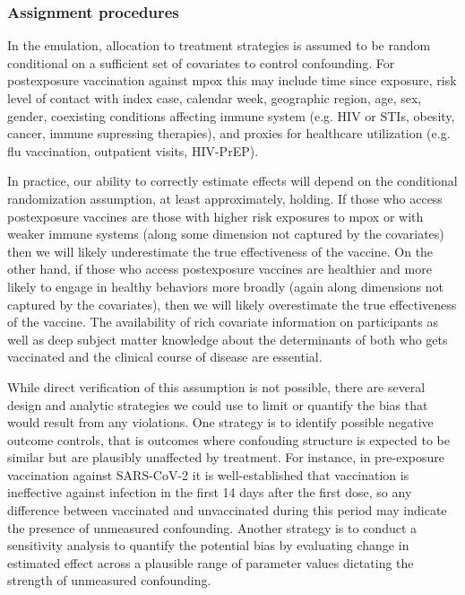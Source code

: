 \documentclass[11pt]{article}
\begin{document}
\subsubsection*{Assignment procedures}
In the emulation, allocation to treatment strategies is assumed to be random conditional on a sufficient set of covariates to control confounding. For postexposure vaccination against mpox this may include time since exposure, risk level of contact with index case, calendar week, geographic region, age, sex, gender, coexisting conditions affecting immune system (e.g. HIV or STIs, obesity, cancer, immune supressing therapies), and proxies for healthcare utilization (e.g. flu vaccination, outpatient visits, HIV-PrEP).

In practice, our ability to correctly estimate effects will depend on the conditional randomization assumption, at least approximately, holding. If those who access postexposure vaccines are those with higher risk exposures to mpox or with weaker immune systems (along some dimension not captured by the covariates) then we will likely underestimate the true effectiveness of the vaccine. On the other hand, if those who access postexposure vaccines are healthier and more likely to engage in healthy behaviors more broadly (again along dimensions not captured by the covariates), then we will likely overestimate the true effectiveness of the vaccine. The availability of rich covariate information on participants as well as deep subject matter knowledge about the determinants of both who gets vaccinated and the clinical course of disease are essential.

While direct verification of this assumption is not possible, there are several design and analytic strategies we could use to limit or quantify the bias that would result from any violations. One strategy is to identify possible negative outcome controls, that is outcomes where confouding structure is expected to be similar but are plausibly unaffected by treatment. For instance, in pre-exposure vaccination against SARS-CoV-2 it is well-established that vaccination is ineffective against infection in the first 14 days after the first dose, so any difference between vaccinated and unvaccinated during this period may indicate the presence of unmeasured confounding.  Another strategy is to conduct a sensitivity analysis to quantify the potential bias by evaluating change in estimated effect across a plausible range of parameter values dictating the strength of unmeasured confounding. 
\end{document}
